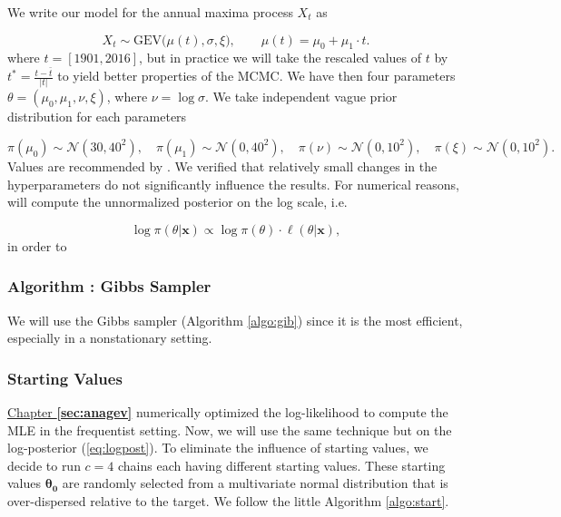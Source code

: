 We write our model for the annual maxima process $X_t$ as  

\begin{equation*}
X_{t}\sim \text{GEV}\big(\mu(t), \sigma, \xi\big), \qquad \mu(t)= \mu_0+\mu_1\cdot t.
\end{equation*}
where $t=[1901,2016]$, but in practice we will take the rescaled values of $t$ by $t^{*} = \frac{t - \bar{t} }{|t|}$ to yield better properties of the  MCMC. 
We have then four parameters $\theta=(\mu_0,\mu_1,\nu,\xi)$, where $\nu=\log\sigma$. We take independent vague prior distribution for each parameters 

\begin{equation*}
\pi(\mu_0)\sim\mathcal{N}(30,40^2),\quad \pi(\mu_1)\sim\mathcal{N}(0,40^2),\quad \pi(\nu)\sim\mathcal{N}(0,10^2),\quad
\pi(\xi)\sim\mathcal{N}(0,10^2).
\end{equation*}
Values are recommended by \citet[chap.13]{dey_extreme_2016}. We verified that relatively small changes in the hyperparameters do not significantly influence the results.
For numerical reasons, will compute the unnormalized posterior on the log scale, i.e.

\begin{equation}\label{eq:logpost}
\log\pi(\theta|\boldsymbol{x})\propto \log\pi(\theta)\cdot \ell(\theta|\boldsymbol{x}),
\end{equation}
in order to 

\subsubsection*{Algorithm : Gibbs Sampler}

We will use the Gibbs sampler (Algorithm \ref{algo:gib}) since it is the most efficient, especially in a nonstationary setting.


\subsubsection*{Starting Values}

\hyperref[sec:anagev]{Chapter \textbf{\ref{sec:anagev}}} numerically optimized the log-likelihood to compute the MLE in the frequentist setting. Now, we will use the same technique but on the log-posterior (\ref{eq:logpost}).
To eliminate the influence of starting values, we decide to run $c=4$ chains each having different starting values. These starting values $\boldsymbol{\theta_0}$ are randomly selected from a multivariate normal distribution that is over-dispersed relative to the target. We follow the little Algorithm \ref{algo:start}.

